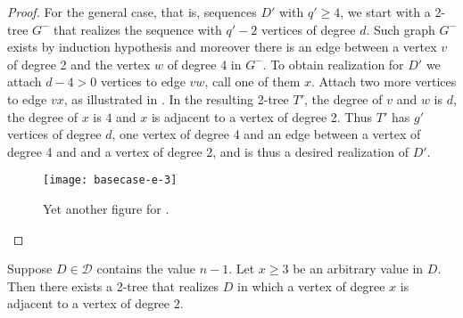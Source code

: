 \documentclass[lotsofwhite,charterfonts]{patmorin}
\begin{document}
\begin{proof}
For the general case, that is, sequences $D'$ with $q'\geq 4$, we
start with a 2-tree $G^-$ that realizes the sequence with $q'-2$
vertices of degree $d$. Such graph $G^-$ exists by induction
hypothesis and moreover there is an edge between a vertex $v$ of
degree 2 and the vertex $w$ of degree 4 in $G^-$. To obtain
realization for $D'$ we attach $d-4>0$ vertices to edge $vw$, call one
of them $x$. Attach two more vertices to edge $vx$, as illustrated in
. In the resulting 2-tree $T'$, the degree of $v$
and $w$ is $d$, the degree of $x$ is $4$ and $x$ is adjacent to a
vertex of degree 2. Thus $T'$ has $g'$ vertices of degree $d$, one
vertex of degree 4 and an edge between a vertex of degree 4 and 
and a vertex of degree 2,
and is thus a desired realization of $D'$.
\begin{figure}
\begin{center} \texttt{[image: basecase-e-3]} \end{center}
\caption{Yet another figure for .}
\end{figure} 
\end{proof}

\begin{lem}
Suppose $D\in \mathcal{D}$ contains the value $n-1$. Let $x \geq 3$ be
an arbitrary value in $D$.  Then there exists a 2-tree that realizes
$D$ in which a vertex of degree $x$ is adjacent to a vertex of degree
$2$.
\end{lem}
\end{document}

